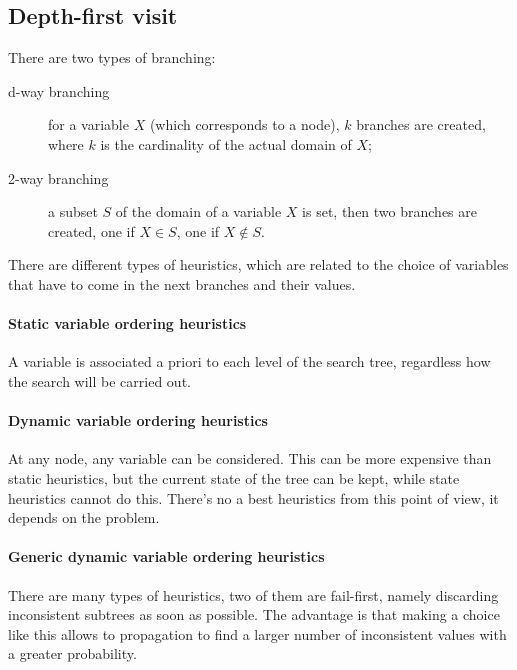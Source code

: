 \documentclass[10pt,a4paper]{article}
\begin{document}
\noindent{}

\subsection{Depth-first visit}
There are two types of branching:

\begin{description}
    \item[d-way branching] for a variable $X$ (which corresponds to a node), $k$
    branches are created, where $k$ is the cardinality of the actual domain of
    $X$;
    \item[2-way branching] a subset $S$ of the domain of a variable $X$ is set,
    then two branches are created, one if $X \in S$, one if $X \notin S$.
\end{description}

There are different types of heuristics, which are related to the choice of
variables that have to come in the next branches and their values.

\paragraph{Static variable ordering heuristics}
A variable is associated a priori to each level of the search tree, regardless
how the search will be carried out.

\paragraph{Dynamic variable ordering heuristics}
At any node, any variable can be considered. This can be more expensive than
static heuristics, but the current state of the tree can be kept, while state
heuristics cannot do this. There's no a best heuristics from this point of view,
it depends on the problem.

\paragraph{Generic dynamic variable ordering heuristics}
There are many types of heuristics, two of them are fail-first, namely
discarding inconsistent subtrees as soon as possible. The advantage is that
making a choice like this allows to propagation to find a larger number of
inconsistent values with a greater probability.
\end{document}
